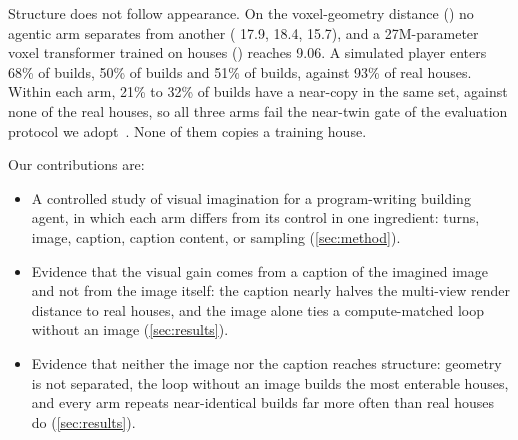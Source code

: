 Structure does not follow appearance. On the voxel-geometry distance (\geomkid{}) no agentic arm
separates from another (\dream{} 17.9, \classicm{} 18.4, \dreamcap{} 15.7), and a 27M-parameter
voxel transformer trained on houses (\voxelar{}) reaches 9.06. A simulated player enters 68\% of
\classicm{} builds, 50\% of \dream{} builds and 51\% of \dreamcap{} builds, against 93\% of real
houses. Within each arm, 21\% to 32\% of builds have a near-copy in the same set, against none
of the real houses, so all three arms fail the near-twin gate of the evaluation protocol we
adopt~\citep{anonymous2027blindness}. None of them copies a training house.

Our contributions are:
\begin{itemize}[leftmargin=*,itemsep=1pt,topsep=2pt]
  \item A controlled study of visual imagination for a program-writing building agent, in which
    each arm differs from its control in one ingredient: turns, image, caption, caption
    content, or sampling (\cref{sec:method}).
  \item Evidence that the visual gain comes from a caption of the imagined image and not from the
    image itself: the caption nearly halves the multi-view render distance to real houses, and the image
    alone ties a compute-matched loop without an image (\cref{sec:results}).
  \item Evidence that neither the image nor the caption reaches structure: geometry is not
    separated, the loop without an image builds the most enterable houses, and every arm repeats
    near-identical builds far more often than real houses do (\cref{sec:results}).
\end{itemize}
